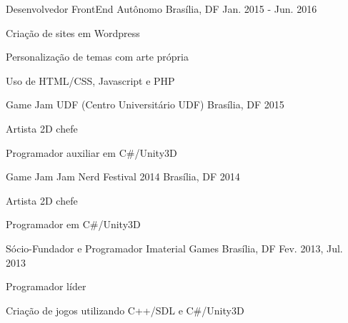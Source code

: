 

\begin{cventries}

  \cventry
    {Desenvolvedor FrontEnd} %
    {Autônomo} %
    {Brasília, DF} %
    {Jan. 2015 - Jun. 2016} %
    {
      \begin{cvitems} %
        \item {Criação de sites em Wordpress}
        \item {Personalização de temas com arte própria}
        \item {Uso de HTML/CSS, Javascript e PHP}
      \end{cvitems}
    }

  \cventry
    {Game Jam} %
    {UDF (Centro Universitário UDF)} %
    {Brasília, DF} %
    {2015} %
    {
      \begin{cvitems} %
        \item {Artista 2D chefe}
        \item {Programador auxiliar em C\#/Unity3D}
      \end{cvitems}
    }

  \cventry
    {Game Jam} %
    {Jam Nerd Festival 2014} %
    {Brasília, DF} %
    {2014} %
    {
      \begin{cvitems} %
        \item {Artista 2D chefe}
		\item {Programador em C\#/Unity3D}
      \end{cvitems}
    }

  \cventry
    {Sócio-Fundador e Programador} %
    {Imaterial Games} %
    {Brasília, DF} %
    {Fev. 2013, Jul. 2013} %
    {
      \begin{cvitems} %
        \item {Programador líder} 
        \item {Criação de jogos utilizando C++/SDL e C\#/Unity3D}
      \end{cvitems}
    }


\end{cventries}
